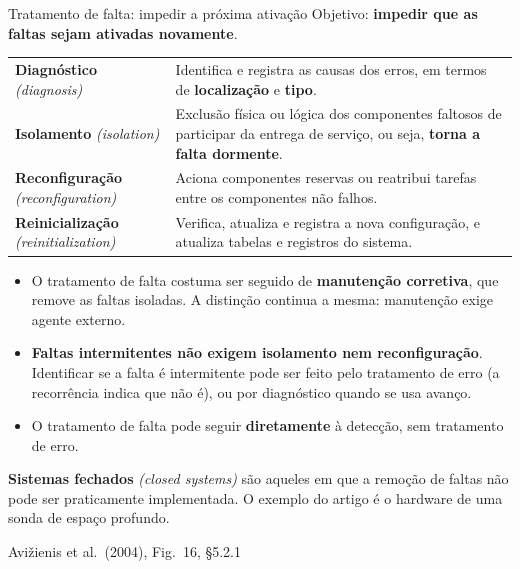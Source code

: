 \documentclass{beamer}
\newcommand{\en}[1]{{\color{depCinza}\textit{#1}}}
\newcommand{\sect}[1]{\par\smallskip\hfill{\tiny\color{black!55}Avi\v{z}ienis et al.\ (2004), #1}}
\begin{document}
\begin{frame}{Tratamento de falta: impedir a pr\'oxima ativa\c{c}\~ao}
    \footnotesize
    Objetivo: \textbf{impedir que as faltas sejam ativadas novamente}.
    \medskip
    \begin{tabularx}{\linewidth}{@{}p{3.4cm} >{\raggedright\arraybackslash}X@{}}
        \toprule
        \textbf{Diagn\'ostico} \en{(diagnosis)} & Identifica e registra as causas dos erros, em termos de \textbf{localiza\c{c}\~ao} e \textbf{tipo}. \\
        \textbf{Isolamento} \en{(isolation)} & Exclus\~ao f\'isica ou l\'ogica dos componentes faltosos de participar da entrega de servi\c{c}o, ou seja, \textbf{torna a falta dormente}. \\
        \textbf{Reconfigura\c{c}\~ao} \en{(reconfiguration)} & Aciona componentes reservas ou reatribui tarefas entre os componentes n\~ao falhos. \\
        \textbf{Reinicializa\c{c}\~ao} \en{(reinitialization)} & Verifica, atualiza e registra a nova configura\c{c}\~ao, e atualiza tabelas e registros do sistema. \\
        \bottomrule
    \end{tabularx}
    \medskip
    \begin{itemize}
        \item O tratamento de falta costuma ser seguido de \textbf{manuten\c{c}\~ao corretiva}, que remove as faltas isoladas. A distin\c{c}\~ao continua a mesma: manuten\c{c}\~ao exige agente externo.
        \item \textbf{Faltas intermitentes n\~ao exigem isolamento nem reconfigura\c{c}\~ao}. Identificar se a falta \'e intermitente pode ser feito pelo tratamento de erro (a recorr\^encia indica que n\~ao \'e), ou por diagn\'ostico quando se usa avan\c{c}o.
        \item O tratamento de falta pode seguir \textbf{diretamente} \`a detec\c{c}\~ao, sem tratamento de erro.
    \end{itemize}
    \medskip
    \begin{defi}
        \scriptsize
        \textbf{Sistemas fechados} \en{(closed systems)} s\~ao aqueles em que a remo\c{c}\~ao de faltas n\~ao pode ser praticamente implementada. O exemplo do artigo \'e o hardware de uma sonda de espa\c{c}o profundo.
    \end{defi}
    \sect{Fig.\ 16, \S5.2.1}
\end{frame}
\end{document}
